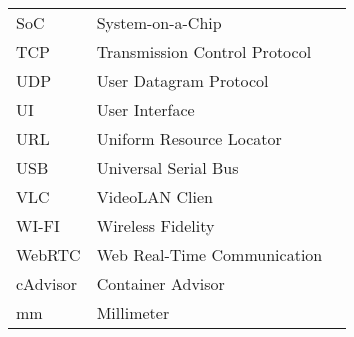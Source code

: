 \begin{table}[ht]
\begin{tabular}{lll}
SoC & System-on-a-Chip \\
TCP & Transmission Control Protocol \\
UDP & User Datagram Protocol \\
UI & User Interface \\
URL & Uniform Resource Locator \\
USB & Universal Serial Bus \\
VLC & VideoLAN Clien \\
WI-FI & Wireless Fidelity \\
WebRTC & Web Real-Time Communication \\
cAdvisor & Container Advisor \\
mm & Millimeter \\
\end{tabular}
\end{table}